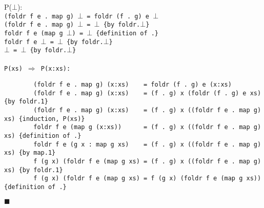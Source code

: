 \documentclass{article}
\begin{document}
\indent P($\bot$):\\
\indent\indent\indent\tt (foldr f e . map g) $\bot$ = foldr (f . g) e $\bot$\\
\indent\indent\indent    (foldr f e . map g) $\bot$ = $\bot$ \indent\indent
\indent\indent\indent\indent\indent\indent\{by foldr.$\bot$\}\\
\indent\indent\indent    foldr f e (map g $\bot$) = $\bot$ \indent\indent
\indent\indent\indent\indent\indent\indent\indent\{definition of .\}\\
\indent\indent\indent    foldr f e $\bot$ = $\bot$ \indent\indent
\indent\indent\indent\indent\indent\indent\indent\indent\indent\indent\{by foldr.$\bot$\}\\
\indent\indent\indent    $\bot$ = $\bot$ \indent\indent\indent\indent\indent
\indent\indent\indent\indent\indent\indent\indent\indent\indent\indent\{by foldr.$\bot$\}\\
\\
\indent\rm P(xs) $\Rightarrow$ P(x:xs):
\begin{verbatim}
        (foldr f e . map g) (x:xs)    = foldr (f . g) e (x:xs)
        (foldr f e . map g) (x:xs)    = (f . g) x (foldr (f . g) e xs)     {by foldr.1}
        (foldr f e . map g) (x:xs)    = (f . g) x ((foldr f e . map g) xs) {induction, P(xs)}
        foldr f e (map g (x:xs))      = (f . g) x ((foldr f e . map g) xs) {definition of .}
        foldr f e (g x : map g xs)    = (f . g) x ((foldr f e . map g) xs) {by map.1}
        f (g x) (foldr f e (map g xs) = (f . g) x ((foldr f e . map g) xs) {by foldr.1}
        f (g x) (foldr f e (map g xs) = f (g x) (foldr f e (map g xs))     {definition of .}
\end{verbatim}
$\blacksquare$
\end{document}
